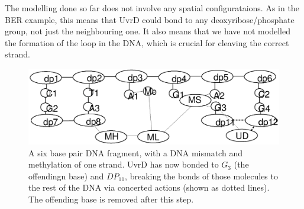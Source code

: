 The modelling done so far does not involve any spatial configurataions. As in the BER example, this means that UvrD could bond to any deoxyribose/phosphate group, not just the neighbouring one. It also means that we have not modelled the formation of the loop in the DNA, which is crucial for cleaving the correct strand.

\begin{figure}[h!]
  \centering
    \includegraphics[width=1.0\textwidth]{mmr/state6}
  \caption[A six base pair DNA fragment.]{A six base pair DNA fragment, with a DNA mismatch and methylation of one strand. UvrD has now bonded to $G_3$ (the offendingn base) and $DP_{11}$, breaking the bonds of those molecules to the rest of the DNA via concerted actions (shown as dotted lines). The offending base is removed after this step.}
  \label{fig:state6}
\end{figure}

